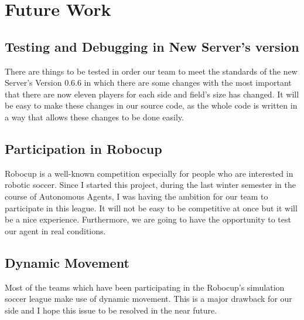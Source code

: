 \chapter{Future Work}
\label{future}

\section{Testing and Debugging in New Server's version}
There are things to be tested in order our team to meet the standards of the new Server's Version 0.6.6 in which there are some changes with the most important that there are now eleven players for each side and field's size has changed. It will be easy to make these changes in our source code, as the whole code is written in a way that allows these changes to be done easily.


\section{Participation in Robocup}
Robocup is a well-known competition especially for people who are interested in robotic soccer. Since I started this project, during the last winter semester in the course of Autonomous Agents, I was having the ambition for our team to participate in this league. It will not be easy to be competitive at once but it will be a nice experience. Furthermore, we are going to have the opportunity to test our agent in real conditions.

\section{Dynamic Movement}
Most of the teams which have been participating in the Robocup's simulation soccer league make use of dynamic movement. This is a major drawback for our side and I hope this issue to be resolved in the near future.
